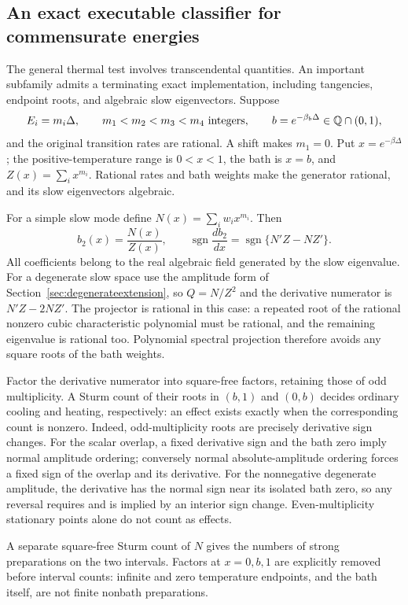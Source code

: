 \documentclass[11pt]{article}
\begin{document}
\subsection{An exact executable classifier for commensurate energies}\label{sec:exactclassifier}
The general thermal test involves transcendental quantities. An important
subfamily admits a terminating exact implementation, including tangencies,
endpoint roots, and algebraic slow eigenvectors. Suppose
\[
E_i=m_i\Delta,\qquad m_1<m_2<m_3<m_4\ \hbox{integers},\qquad
b=e^{-\beta_b\Delta}\in\mathbb Q\cap(0,1),
\]
and the original transition rates are rational. A shift makes $m_1=0$.
Put $x=e^{-\beta\Delta}$; the positive-temperature range is $0<x<1$,
the bath is $x=b$, and $Z(x)=\sum_i x^{m_i}$. Rational rates and bath
weights make the generator rational, and its slow eigenvectors algebraic.

For a simple slow mode define $N(x)=\sum_iw_i x^{m_i}$. Then
\[
b_2(x)=\frac{N(x)}{Z(x)},\qquad
\operatorname{sgn}\frac{db_2}{dx}
=\operatorname{sgn}\{N'Z-NZ'\}.
\]
All coefficients belong to the real algebraic field generated by the slow
eigenvalue. For a degenerate slow space use the amplitude form of
Section~\ref{sec:degenerateextension}, so $Q=N/Z^2$ and the derivative
numerator is $N'Z-2NZ'$. The projector is rational in this case: a repeated
root of the rational nonzero cubic characteristic polynomial must be
rational, and the remaining eigenvalue is rational too. Polynomial spectral
projection therefore avoids any square roots of the bath weights.

Factor the derivative numerator into square-free factors, retaining those
of odd multiplicity. A Sturm count of their roots in $(b,1)$ and $(0,b)$
decides ordinary cooling and heating, respectively: an effect exists exactly
when the corresponding count is nonzero. Indeed, odd-multiplicity roots are
precisely derivative sign changes. For the scalar overlap, a fixed derivative
sign and the bath zero imply normal amplitude ordering; conversely normal
absolute-amplitude ordering forces a fixed sign of the overlap and its
derivative. For the nonnegative degenerate amplitude, the derivative has
the normal sign near its isolated bath zero, so any reversal requires and
is implied by an interior sign change. Even-multiplicity stationary points
alone do not count as effects.

A separate square-free Sturm count of $N$ gives the numbers of strong
preparations on the two intervals. Factors at $x=0,b,1$ are explicitly
removed before interval counts: infinite and zero temperature endpoints,
and the bath itself, are not finite nonbath preparations.
\end{document}

